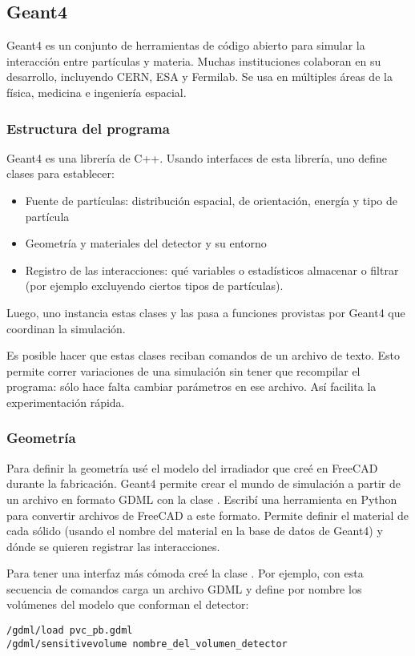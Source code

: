 \subsection{Geant4}
Geant4 es un conjunto de herramientas de código abierto
para simular la interacción entre partículas y materia.
Muchas instituciones colaboran en su desarrollo,
incluyendo CERN, ESA y Fermilab.
Se usa en múltiples áreas de la física, medicina e ingeniería espacial.
\subsubsection{Estructura del programa}
Geant4 es una librería de C++.
Usando interfaces de esta librería,
uno define clases para establecer:
\begin{itemize}
    \item Fuente de partículas: distribución espacial, de orientación, energía
        y tipo de partícula
    \item Geometría y materiales del detector y su entorno
    \item Registro de las interacciones: qué variables o estadísticos
        almacenar o filtrar (por ejemplo excluyendo ciertos tipos de
        partículas).
\end{itemize}
Luego, uno instancia estas clases y las pasa a funciones provistas por Geant4
que coordinan la simulación.

Es posible hacer que estas clases reciban comandos de un archivo de texto.
Esto permite correr variaciones de una simulación sin tener que recompilar el
programa: sólo hace falta cambiar parámetros en ese archivo.
Así facilita la experimentación rápida.
\subsubsection{Geometría}
Para definir la geometría usé el modelo del irradiador que creé en FreeCAD
durante la fabricación.
Geant4 permite crear el mundo de simulación a partir de un archivo
en formato GDML\cite{chytracek_geometry_2006}
con la clase .
Escribí una herramienta en Python para convertir archivos 
 de FreeCAD
a este formato.
Permite definir el material de cada sólido
(usando el nombre del material en la base de datos de Geant4)
y dónde se quieren registrar las interacciones.

Para tener una interfaz más cómoda creé la clase
. 
Por ejemplo, con esta secuencia de comandos carga un archivo GDML y define
por nombre los volúmenes del modelo que conforman el detector:
\begin{verbatim}
/gdml/load pvc_pb.gdml
/gdml/sensitivevolume nombre_del_volumen_detector
\end{verbatim}

